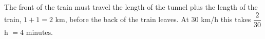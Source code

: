 The front of the train must travel the length of the tunnel plus the length of the train, $1+1=2$ km, before the back of the train leaves. At $30$ km/h this takes $\dfrac{2}{30}$ h $=\boxed{4\text{ minutes}}$.
